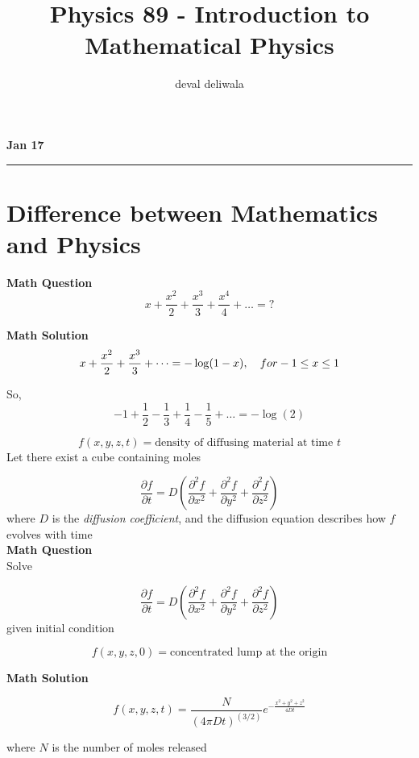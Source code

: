 \documentclass[svgnames]{article}   	%
\title{Physics 89 - Introduction to Mathematical Physics}
\author{deval deliwala}
\begin{document}
\maketitle
\tableofcontents 					           %
\newpage

\noindent \textbf{Jan 17} \hrule


\section{Difference between Mathematics and Physics}
\vspace{5px}

\begin{tcolorbox}[title = Example 1 - Electrostatics]

\textbf{Math Question}
\[
  x + \frac{x^2}{2} + \frac{x^3}{3} + \frac{x^4}{4} + \dots = ? 
\]

\noindent \textbf{Math Solution}
\[
x + \frac{x^2}{2} + \frac{x^3}{3} + \dots = -\log(1-x), \hspace{10px} for -1
\leq x \leq 1
\]

So, 
\[
-1 + \frac{1}{2} - \frac{1}{3} + \frac{1}{4} - \frac{1}{5} + \dots = -\log(2)
\]

\end{tcolorbox}
\vspace{5px}
\begin{tcolorbox}[title = Example 2 - Diffusion] 
  
 \[
   f(x,y,z,t) = \text{density of diffusing material at time $t$}
 \]
 Let there exist a cube containing moles 

 \[
 \frac{\partial f}{\partial t} = D\left( \frac{\partial^2 f}{\partial x^2}
 + \frac{\partial^2 f}{\partial y^2} + \frac{\partial^2 f}{\partial z^2}\right)
 \]
 where $D$ is the \textit{diffusion coefficient}, and the diffusion equation
 describes how $f$ evolves with time \\

 \textbf{Math Question} \\

 Solve 

 \[
 \frac{\partial f}{\partial t} = D \left( \frac{\partial^2 f}{\partial x^2}
   + \frac{\partial^2 f}{\partial y^2} + \frac{\partial^2 f}{\partial
   z^2}\right)
 \]
 given initial condition 

  \[
    f(x,y,z,0) = \text{concentrated lump at the origin} 
 \]
 
 \textbf{Math Solution}
 
\[
  f(x,y,z,t) = \frac{N}{(4\pi D t)^(3/2)}e^{-\frac{x^2 + y^2 + z^2}{4Dt}}
\] \vspace{5px}

where $N$ is the number of moles released
  

\end{tcolorbox}	
\end{document}
